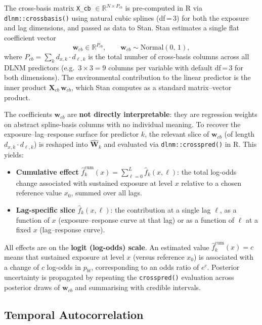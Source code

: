 \documentclass[12pt,a4paper]{article}
\begin{document}
The cross-basis matrix \texttt{X\_cb} $\in \mathbb{R}^{N \times P_{cb}}$ is pre-computed in R via \texttt{dlnm::crossbasis()} using natural cubic splines (df\,=\,3) for both the exposure and lag dimensions, and passed as data to Stan. Stan estimates a single flat coefficient vector
\begin{equation}
  \mathbf{w}_{cb} \in \mathbb{R}^{P_{cb}}, \qquad \mathbf{w}_{cb} \sim \text{Normal}(0,\,1),
\end{equation}
where $P_{cb} = \sum_k d_{x,k} \cdot d_{\ell,k}$ is the total number of cross-basis columns across all DLNM predictors (e.g.\ $3 \times 3 = 9$ columns per variable with default df\,=\,3 for both dimensions). The environmental contribution to the linear predictor is the inner product $\mathbf{X}_{cb}\,\mathbf{w}_{cb}$, which Stan computes as a standard matrix--vector product.

The coefficients $\mathbf{w}_{cb}$ are \textbf{not directly interpretable}: they are regression weights on abstract spline-basis columns with no individual meaning. To recover the exposure--lag--response surface for predictor $k$, the relevant slice of $\mathbf{w}_{cb}$ (of length $d_{x,k} \cdot d_{\ell,k}$) is reshaped into $\widehat{\mathbf{W}}_k$ and evaluated via \texttt{dlnm::crosspred()} in R. This yields:
\begin{itemize}
  \item \textbf{Cumulative effect} $\hat{f}_k^{\mathrm{cum}}(x) = \sum_{\ell=0}^{L} \hat{f}_k(x, \ell)$: the total log-odds change associated with sustained exposure at level $x$ relative to a chosen reference value $x_0$, summed over all lags.
  \item \textbf{Lag-specific slice} $\hat{f}_k(x, \ell)$: the contribution at a single lag $\ell$, as a function of $x$ (exposure--response curve at that lag) or as a function of $\ell$ at a fixed $x$ (lag--response curve).
\end{itemize}
All effects are on the \textbf{logit (log-odds) scale}. An estimated value $\hat{f}_k^{\mathrm{cum}}(x) = c$ means that sustained exposure at level $x$ (versus reference $x_0$) is associated with a change of $c$ log-odds in $p_{bt}$, corresponding to an odds ratio of $e^c$. Posterior uncertainty is propagated by repeating the \texttt{crosspred()} evaluation across posterior draws of $\mathbf{w}_{cb}$ and summarising with credible intervals.

\subsection{Temporal Autocorrelation}
\end{document}
